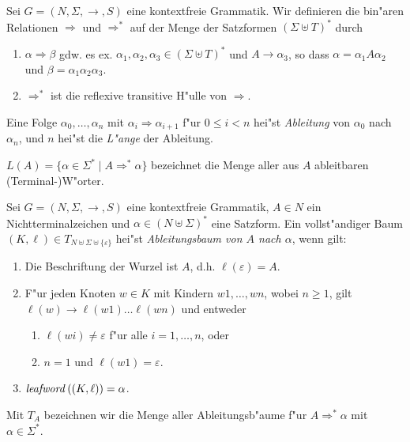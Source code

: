 \documentclass[12pt,a4paper]{article}
\begin{document}
\begin{definition}[Ableitungen]
  Sei $G=(N,\Sigma,\to,S)$ eine kontextfreie Grammatik. Wir definieren die bin"aren Relationen $\Rightarrow$
  und $\Rightarrow^*$ auf der Menge der Satzformen $(\Sigma \uplus T)^*$ durch
  \begin{enumerate}
  \item $\alpha \Rightarrow \beta$ gdw. es ex. $\alpha_1,\alpha_2,\alpha_3\in (\Sigma \uplus T)^*$ und
    $A \to \alpha_3$, so dass $\alpha = \alpha_1 A \alpha_2$ und $\beta = \alpha_1\alpha_2\alpha_3$.
  \item $\Rightarrow^*$ ist die reflexive transitive H"ulle von $\Rightarrow$.
  \end{enumerate}
  Eine Folge $\alpha_0,\ldots,\alpha_n$ mit $\alpha_i \Rightarrow \alpha_{i+1}$ f"ur $0 \le i < n$ hei"st
  \emph{Ableitung} von $\alpha_0$ nach $\alpha_n$, und $n$ hei"st die \emph{L"ange} der Ableitung.
\end{definition}

$L(A) = \{\alpha \in \Sigma^* \mid A \Rightarrow^* \alpha\}$ bezeichnet die Menge aller
aus $A$ ableitbaren (Terminal-)W"orter.

\begin{definition}[Ableitungsbaum]
  Sei $G=(N,\Sigma,\to,S)$ eine kontextfreie Grammatik, $A \in N$ ein Nichtterminalzeichen und
  $\alpha \in (N \uplus \Sigma)^*$ eine Satzform. Ein vollst"andiger Baum
  $(K,\ell) \in T_{N \uplus \Sigma \uplus \{\varepsilon\}}$ hei"st
  \emph{Ableitungsbaum von $A$ nach $\alpha$}, wenn gilt:
  \begin{enumerate}
  \item Die Beschriftung der Wurzel ist $A$, d.h. $\ell(\varepsilon)=A$.
  \item F"ur jeden Knoten $w \in K$ mit Kindern $w1,\ldots,wn$, wobei $n \ge 1$, gilt
    $\ell(w) \to \ell(w1)\ldots\ell(wn)$ und entweder
    \begin{enumerate}
    \item $\ell(wi)\ne\varepsilon$ f"ur alle $i=1,\ldots,n$, oder
    \item $n = 1$ und $\ell(w1)=\varepsilon$.
    \end{enumerate}
  \item $\mathit{leafword}\,((K,\ell)) = \alpha$.
  \end{enumerate}
  Mit $T_A$ bezeichnen wir die Menge aller Ableitungsb"aume f"ur $A \Rightarrow^* \alpha$ mit
  $\alpha \in \Sigma^*$.
\end{definition}
\end{document}
